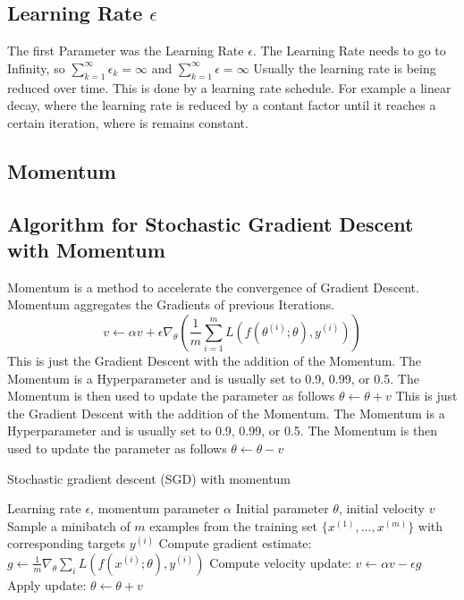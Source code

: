 \documentclass[a4paper]{article}
\begin{document}
    \subsection{Learning Rate $\epsilon$}
    The first Parameter was the Learning Rate $\epsilon$. The Learning Rate needs to go to Infinity, so $\sum_{k=1}^{\infty} \epsilon_{k} = \infty$ and $\sum_{k=1}^{\infty} \epsilon = \infty$ Usually the learning rate is being reduced over time. This is done by a learning rate schedule. For example a linear decay, where the learning rate is reduced by a contant factor until it reaches a certain iteration, where is remains constant. 

    \subsection{Momentum}
    \subsection{Algorithm for Stochastic Gradient Descent with Momentum}
    Momentum is a method to accelerate the convergence of Gradient Descent. Momentum aggregates the Gradients of previous Iterations. $$v \leftarrow \alpha v + \epsilon \nabla_{\theta}(\frac{1}{m} \sum_{i=1}^{m} L(f(\theta^{(i)};\theta),y^{(i)})) $$ This is just the Gradient Descent with the addition of the Momentum. The Momentum is a Hyperparameter and is usually set to 0.9, 0.99, or 0.5. The Momentum is then used to update the parameter as follows $\theta \leftarrow \theta + v$ This is just the Gradient Descent with the addition of the Momentum. The Momentum is a Hyperparameter and is usually set to 0.9, 0.99, or 0.5. The Momentum is then used to update the parameter as follows $\theta \leftarrow \theta - v$
    \begin{algorithm}
\caption{Stochastic gradient descent (SGD) with momentum}
\begin{algorithmic}
\Require Learning rate $\epsilon$, momentum parameter $\alpha$
\Require Initial parameter $\theta$, initial velocity $v$
    \State Sample a minibatch of $m$ examples from the training set $\{ x^{(1)}, \ldots, x^{(m)} \}$ with corresponding targets $y^{(i)}$
    \State Compute gradient estimate: $g \leftarrow \frac{1}{m} \nabla_\theta \sum_i L(f(x^{(i)}; \theta), y^{(i)})$
    \State Compute velocity update: $v \leftarrow \alpha v - \epsilon g$
    \State Apply update: $\theta \leftarrow \theta + v$
\EndWhile
\end{algorithmic}
\end{algorithm}
\end{document}
